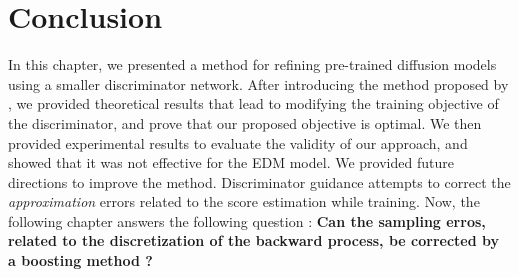\section{Conclusion}\label{sec:dg:conclusion}
In this chapter, we presented a method for refining pre-trained diffusion models using a smaller discriminator network. After introducing the method proposed by \citep{kim2023refininggenerativeprocessdiscriminator}, we provided theoretical results that lead to modifying the training objective of the discriminator, and prove that our proposed objective is optimal.
We then provided experimental results to evaluate the validity of our approach, and showed that it was not effective for the EDM model. We provided future directions to improve the method. 
Discriminator guidance attempts to correct the \textit{approximation} errors related to the score estimation while training. Now, the following chapter answers the following question : \textbf{Can the sampling erros, related to the discretization of the backward process, be corrected by a boosting method ?}


